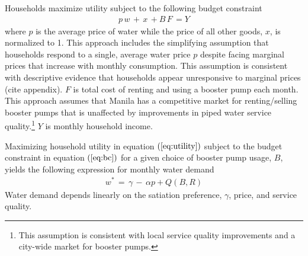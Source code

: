 \documentclass[12pt,table]{article}
\begin{document}

Households maximize utility subject to the following budget constraint
\begin{align}
\label{eq:bc}
p\,w \,+\, x \, +  B \, F \, = Y
\end{align}
where $p$ is the average price of water while the price of all other goods, $x$, is normalized to 1.  This approach includes the simplifying assumption that households respond to a single, average water price $p$ despite facing marginal prices that increase with monthly consumption.  This assumption is consistent with descriptive evidence that households appear unresponsive to marginal prices (cite appendix).   $F$ is total cost of renting and using a booster pump each month.  This approach assumes that Manila has a competitive market for renting/selling booster pumps that is unaffected by improvements in piped water service quality.\footnote{This assumption is consistent with local service quality improvements and a city-wide market for booster pumps.}  $Y$ is monthly household income.  



Maximizing household utility in equation $(\ref{eq:utility})$ subject to the budget constraint in equation $(\ref{eq:bc})$ for a given choice of booster pump usage, $B$, yields the following expression for monthly water demand
\begin{align}
\label{eq:demand}
w^{*} \, = \, \gamma \, - \, \alpha p +  Q(B,R)
\end{align}
Water demand depends linearly on the satiation preference, $\gamma$, price, and service quality.
\end{document}
